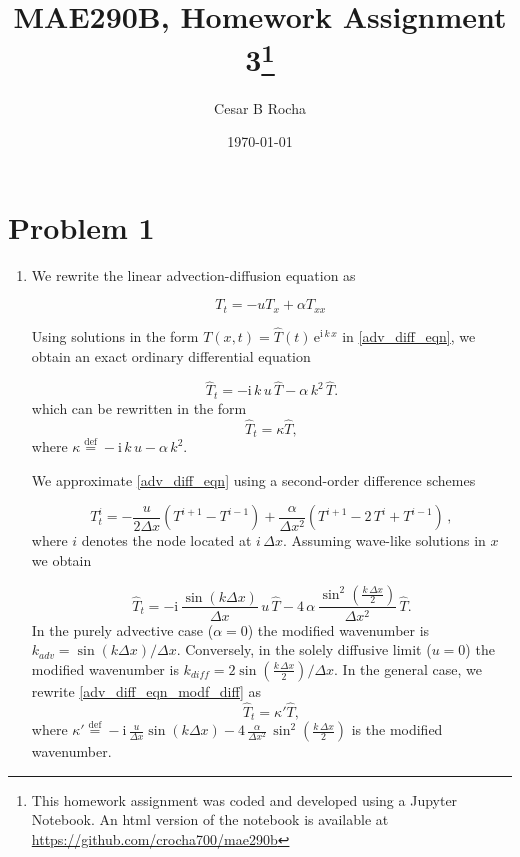 \documentclass[11pt]{article}
\title{MAE290B, Homework Assignment 3\footnote{This homework assignment was coded and developed using a Jupyter Notebook. An html version of the notebook is available at \href{https://github.com/crocha700/mae290b}{https://github.com/crocha700/mae290b}}}
\author{Cesar B Rocha}
\date{\today}
\newcommand{\defn}{\stackrel{\text{def}}{=}}
\newcommand{\ii}{\mathrm{i}}
\newcommand{\ee}{\mathrm{e}}
\def\beq{\begin{equation}}
\def\eeq{\end{equation}}
\begin{document}
\maketitle

\section*{Problem 1}

\begin{enumerate}[label=(\alph*)]

    \item We rewrite the linear advection-diffusion equation as

        \beq
            \label{adv_diff_eqn}
            T_t = -u T_x + \alpha T_{xx} \,
        \eeq

        Using solutions in the form $T(x,t) = \hat{T}(t) \, \ee^{\ii \, k \, x}$ in \eqref{adv_diff_eqn}, we obtain an exact ordinary differential equation

        \beq
            \label{adv_diff_eqn_modf}
            \hat{T}_t = -\ii \, k \, u\, \hat{T} - \alpha \, k^2 \, \hat{T}.
        \eeq
        which can be rewritten in the form
        \beq
            \label{adv_diff_eqn2}
            \hat{T}_t = \kappa \hat{T},
        \eeq
        where $\kappa \defn - \ii \, k \, u - \alpha \, k^2$.

       We approximate \eqref{adv_diff_eqn} using a second-order difference schemes

        \beq
            \label{adv_diff_eqn_diff}
            T_t^i = - \frac{u}{2 \Delta x}\left(T^{i+1} - T^{i-1} \right) + \frac{\alpha}{\Delta x^2} \left( T^{i+1} - 2 \, T^i + T^{i-1}\right) \, ,
        \eeq
        where $i$ denotes the node located at $i\, \Delta x$. Assuming wave-like solutions in $x$ we obtain

        \beq
            \label{adv_diff_eqn_modf_diff}
            \hat{T}_t = -\ii \, \frac{\sin{\left(k\Delta x\right)}}{\Delta x} \, u\, \hat{T} - 4 \, \alpha \, \frac{\sin^2{\left(\tfrac{k \, \Delta x}{2}\right)}}{\Delta x^2} \, \hat{T}.
        \eeq
        In the purely advective case ($\alpha = 0$) the modified wavenumber is $k_{adv} = \sin{\left(k \Delta x\right)}/\Delta x$. Conversely, in the solely diffusive limit ($u = 0$) the modified wavenumber is $k_{diff} = 2 \sin{\left(\tfrac{k \, \Delta x}{2}\right)}/\Delta x$. In the general case, we rewrite \eqref{adv_diff_eqn_modf_diff} as 
        \beq
            \label{adv_diff_eqn2}
            \hat{T}_t = \kappa' \hat{T},
        \eeq
        where $\kappa' \defn -  \ii \, \frac{u}{\Delta x}\sin{\left(k\Delta x\right)}  - 4 \, \frac{\alpha}{\Delta x^2} \, \sin^2{\left(\tfrac{k \, \Delta x}{2}\right)}$ is the modified wavenumber.




\end{enumerate}
\end{document}
